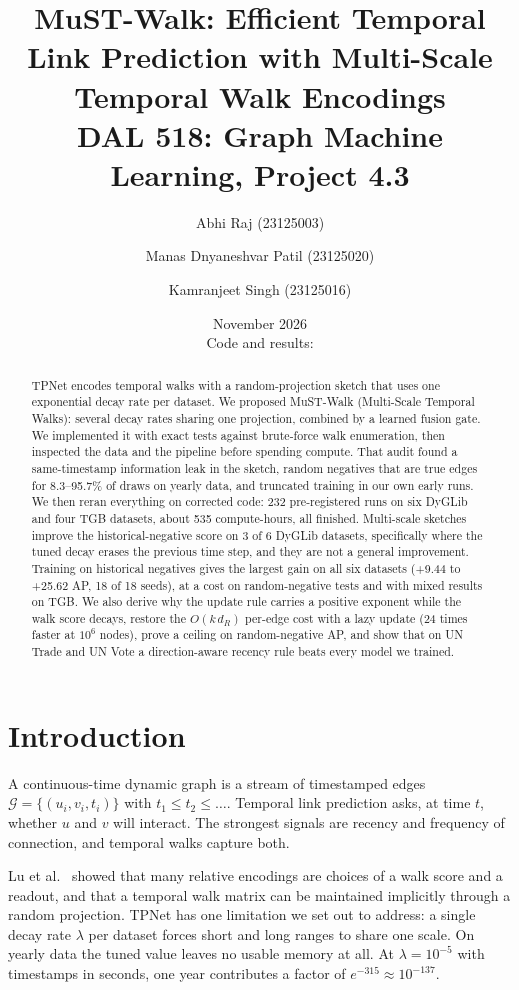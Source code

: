 \documentclass[11pt,a4paper]{article}
\title{\textbf{MuST-Walk: Efficient Temporal Link Prediction with Multi-Scale Temporal Walk Encodings}\\[4pt]
\large DAL 518: Graph Machine Learning, Project 4.3}
\author{Abhi Raj (23125003) \and Manas Dnyaneshvar Patil (23125020) \and Kamranjeet Singh (23125016)}
\date{November 2026\\[3pt]\normalsize Code and results: \repourl}
\theoremstyle{remark}
\begin{document}
\maketitle

\begin{abstract}
TPNet encodes temporal walks with a random-projection sketch that uses one exponential decay rate per dataset. We proposed MuST-Walk (Multi-Scale Temporal Walks): several decay rates sharing one projection, combined by a learned fusion gate. We implemented it with exact tests against brute-force walk enumeration, then inspected the data and the pipeline before spending compute. That audit found a same-timestamp information leak in the sketch, random negatives that are true edges for 8.3--95.7\% of draws on yearly data, and truncated training in our own early runs. We then reran everything on corrected code: 232 pre-registered runs on six DyGLib and four TGB datasets, about 535 compute-hours, all finished. Multi-scale sketches improve the historical-negative score on 3 of 6 DyGLib datasets, specifically where the tuned decay erases the previous time step, and they are not a general improvement. Training on historical negatives gives the largest gain on all six datasets (+9.44 to +25.62 AP, 18 of 18 seeds), at a cost on random-negative tests and with mixed results on TGB. We also derive why the update rule carries a positive exponent while the walk score decays, restore the $O(k\,d_R)$ per-edge cost with a lazy update (24 times faster at $10^6$ nodes), prove a ceiling on random-negative AP, and show that on UN Trade and UN Vote a direction-aware recency rule beats every model we trained.
\end{abstract}

\section{Introduction}
A continuous-time dynamic graph is a stream of timestamped edges $\mathcal{G}=\{(u_i,v_i,t_i)\}$ with $t_1\le t_2\le\dots$. Temporal link prediction asks, at time $t$, whether $u$ and $v$ will interact. The strongest signals are recency and frequency of connection, and temporal walks capture both.

Lu et al.\ \cite{tpnet} showed that many relative encodings are choices of a walk score and a readout, and that a temporal walk matrix can be maintained implicitly through a random projection. TPNet has one limitation we set out to address: a single decay rate $\lambda$ per dataset forces short and long ranges to share one scale. On yearly data the tuned value leaves no usable memory at all. At $\lambda=10^{-5}$ with timestamps in seconds, one year contributes a factor of $e^{-315}\approx 10^{-137}$.
\end{document}
